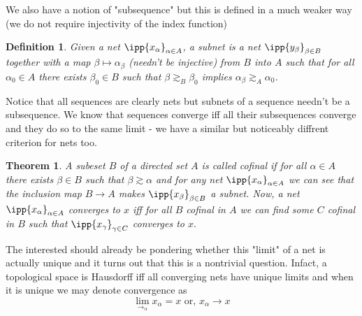 \documentclass[12pt,english]{article}
\newtheorem{theorem}{Theorem}[section]
\newtheorem{definition}{Definition}[section]
\begin{document}
We also have a notion of "subsequence" but this is defined in a much weaker way (we do not require injectivity of the index function) 
\begin{definition}
    Given a net $\ipp{x_\alpha}_{\alpha\in A}$, a subnet is a net $\ipp{y_\beta}_{\beta\in B}$ together with a map $\beta\mapsto\alpha_\beta$ (needn't be injective) from $B$ into $A$ such that for all $\alpha_0\in A$ there exists $\beta_0\in B$ such that $\beta\gtrsim_B\beta_0$ implies $\alpha_\beta\gtrsim_A\alpha_0$.
\end{definition}
Notice that all sequences are clearly nets but subnets of a sequence needn't be a subsequence. 
We know that sequences converge iff all their subsequences converge and they do so to the same limit - we have a similar but noticeably diffrent criterion for nets too. 
\begin{theorem}
    A subeset $B$ of a directed set $A$ is called cofinal if for all $\alpha\in A$ there exists $\beta\in B$ such that $\beta\gtrsim\alpha$ and for any net $\ipp{x_\alpha}_{\alpha\in A}$ we can see that the inclusion map $B\rightarrow A$ makes $\ipp{x_\beta}_{\beta\in B}$ a subnet. Now, a net $\ipp{x_\alpha}_{\alpha\in A}$ converges to $x$ iff for all $B$ cofinal in $A$ we can find some $C$ cofinal in $B$ such that $\ipp{x_\gamma}_{\gamma\in C}$ converges to $x.$
\end{theorem}

The interested should already be pondering whether this "limit" of a net is actually unique and it turns out that this is a nontrivial question. 
Infact, a topological space is Hausdorff iff all converging nets have unique limits and when it is unique we may denote convergence as 
\[
    \lim_{\longrightarrow_\alpha}x_\alpha=x\text{ or, }x_\alpha\longrightarrow x
\]
\end{document}
